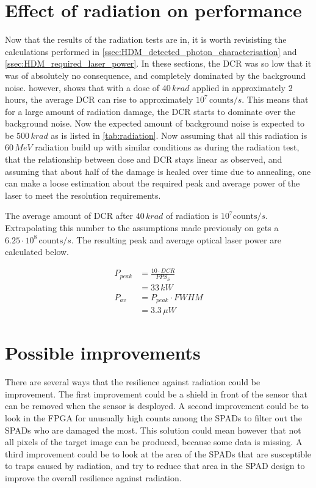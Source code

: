 \section{Effect of radiation on performance}\label{ssec:effect_on_performance}
Now that the results of the radiation tests are in, it is worth revisisting the calculations performed in \cref{ssec:HDM_detected_photon_characterisation} and \cref{ssec:HDM_required_laser_power}.
In these sections, the DCR was so low that it was of absolutely no consequence, and completely dominated by the background noise.  however, shows that with a dose of $40\,krad$ applied in approximately 2 hours, the average DCR can rise to approximately $10^{7}\,\text{counts}/s$. 
This means that for a large amount of radiation damage, the DCR starts to dominate over the background noise. Now the expected amount of background noise is expected to be $500\,krad$ as is listed in \cref{tab:radiation}. Now assuming that all this radiation is $60\,MeV$ radiation build up with similar conditions as during the radiation test, that the relationship between dose and DCR stays linear as observed, and assuming that about half of the damage is healed over time due to annealing, one can make a loose estimation about the required peak and average power of the laser to meet the resolution requirements.

The average amount of DCR after $40\,krad$ of radiation is $10^{7}\text{counts}/s$. Extrapolating this number to the assumptions made previously on gets a $6.25\cdot10^8\,\text{counts}/s$. The resulting peak and average optical laser power are calculated below.

\begin{align*}
	P_{peak}&= \frac{10\cdot DCR}{PPS_S}\\
	&= 33\,kW\\
	P_{av} &= P_{peak}\cdot FWHM\\
	&= 3.3\,\mu W
\end{align*}

\section{Possible improvements}\label{ssec:possible_improvements}
There are several ways that the resilience against radiation could be improvement. The first improvement could be a shield in front of the sensor that can be removed when the sensor is desployed. A second improvement could be to look in the FPGA for unusually high counts among the SPADs to filter out the SPADs who are damaged the most. This solution could mean however that not all pixels of the target image can be produced, because some data is missing. A third improvement could be to look at the area of the SPADs that are susceptible to traps caused by radiation, and try to reduce that area in the SPAD design to improve the overall resilience against radiation.
